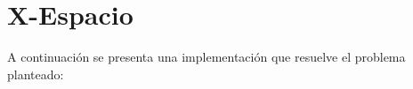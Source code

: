 \section{X-Espacio}

A continuación se presenta una implementación que resuelve el problema planteado:
  

